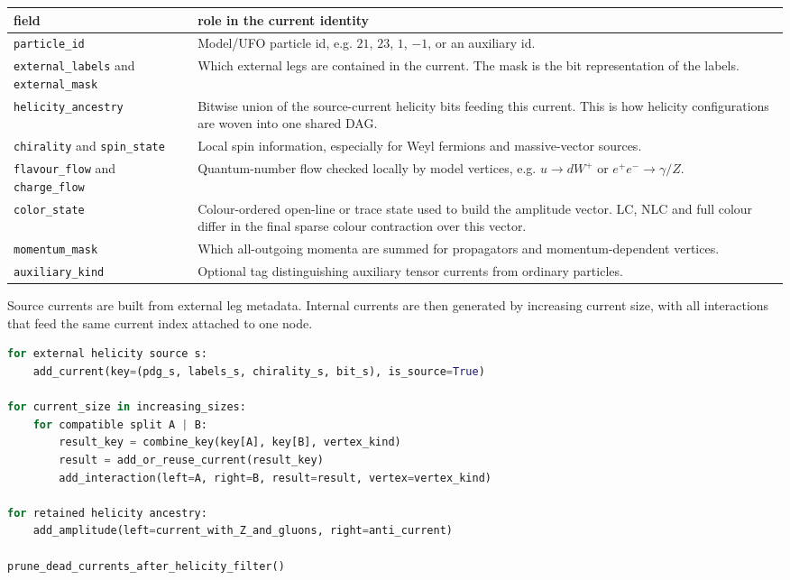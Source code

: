 \documentclass[10pt]{article}
\begin{document}
\begin{center}
\begin{tabular}{@{}L{1.45in}L{4.95in}@{}}
\toprule
\textbf{field} & \textbf{role in the current identity} \\
\midrule
\texttt{particle\_id} & Model/UFO particle id, e.g. $21$, $23$, $1$, $-1$, or an auxiliary id. \\
\texttt{external\_labels} and \texttt{external\_mask} & Which external legs are contained in the current.  The mask is the bit representation of the labels. \\
\texttt{helicity\_ancestry} & Bitwise union of the source-current helicity bits feeding this current.  This is how helicity configurations are woven into one shared DAG. \\
\texttt{chirality} and \texttt{spin\_state} & Local spin information, especially for Weyl fermions and massive-vector sources. \\
\texttt{flavour\_flow} and \texttt{charge\_flow} & Quantum-number flow checked locally by model vertices, e.g. $u\to d W^+$ or $e^+e^-\to\gamma/Z$. \\
\texttt{color\_state} & Colour-ordered open-line or trace state used to build the amplitude vector.  LC, NLC and full colour differ in the final sparse colour contraction over this vector. \\
\texttt{momentum\_mask} & Which all-outgoing momenta are summed for propagators and momentum-dependent vertices. \\
\texttt{auxiliary\_kind} & Optional tag distinguishing auxiliary tensor currents from ordinary particles. \\
\bottomrule
\end{tabular}
\end{center}

Source currents are built from external leg metadata.  Internal currents are
then generated by increasing current size, with all interactions that feed the
same current index attached to one node.

\begin{lstlisting}[language=Python]
for external helicity source s:
    add_current(key=(pdg_s, labels_s, chirality_s, bit_s), is_source=True)

for current_size in increasing_sizes:
    for compatible split A | B:
        result_key = combine_key(key[A], key[B], vertex_kind)
        result = add_or_reuse_current(result_key)
        add_interaction(left=A, right=B, result=result, vertex=vertex_kind)

for retained helicity ancestry:
    add_amplitude(left=current_with_Z_and_gluons, right=anti_current)

prune_dead_currents_after_helicity_filter()
\end{lstlisting}
\end{document}
